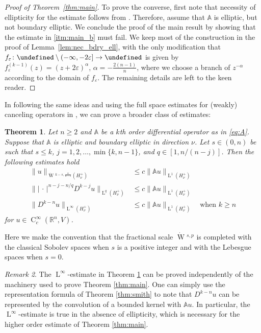 \documentclass[a4paper,10pt]{amsart}
\let\C\undefined
\newcommand{\R}{\mathbb R}
\renewcommand{\leq}{\leqslant}
\newcommand{\lebe}{\operatorname{L}}
\newcommand{\sobo}{\operatorname{W}}
\newcommand{\hold}{\operatorname{C}}
\newcommand{\A}{\mathbb{A}}
\newcommand{\C}{\mathbb{C}}
\numberwithin{equation}{section}
\newtheorem{theorem}{Theorem}[section]
\theoremstyle{remark}
\newtheorem{remark}[theorem]{Remark}
\numberwithin{equation}{section}
\begin{document}
\begin{proof}[Proof of Theorem~\ref{thm:main}]
		To prove the converse, first note that necessity of ellipticity for the estimate follows from \cite[Cor. 5.2]{VS}. Therefore, assume that $\A$ is elliptic, but not boundary elliptic.
		We conclude the proof of the main result by showing that the estimate in \ref{itm:main_b} must fail.
		We keep most of the construction in the proof of Lemma~\ref{lem:nec_bdry_ell}, with the only modification that $f_\varepsilon\colon\C\setminus(-\infty,-2\varepsilon]\rightarrow \C$ is given by $f^{(k-1)}_\varepsilon(z)=(z+2\varepsilon)^{\alpha}$, $\alpha=-\frac{2(n-1)}{n}$, where we choose a branch of $z^{-\alpha}$ according to the domain of $f_\varepsilon$. The remaining details are left to the keen reader.
	\end{proof}
	In following the same ideas and using the full space estimates for (weakly) canceling operators in \cite{VS,BVS,R_tams}, we can prove a broader class of estimates:
	\begin{theorem}\label{thm:estimates}
		Let \(n \ge 2\) and $\A$ be a $k$th order differential operator as in \eqref{eq:A}. Suppose that $\A$ is elliptic and boundary elliptic in direction $\nu$. Let $s\in(0,n)$ be such that $s\leq k$, $j=1,2,\ldots,\min\{k,n-1\}$, and $q\in[1,n/(n-j)]$. Then the following estimates hold
		\begin{align*}
			\|u\|_{{\dot{\sobo}}{^{k-s,\frac{n}{n-s}}}(H^+_\nu)}&\leq c\|\A u\|_{\lebe^1(H^+_\nu)}\\
			\||\,\cdot\,|^{n-j-n/q}D^{k-j}u\|_{\lebe^q(H^+_\nu)}&\leq c\|\A u\|_{\lebe^1(H^+_\nu)}\\
			\|D^{k-n}u\|_{\lebe^\infty(H^+_\nu)}&\leq c\|\A u\|_{\lebe^1(H^+_\nu)}\quad\text{when } k\geq n
		\end{align*}
		for $u\in\hold_c^\infty(\R^n,V)$.
	\end{theorem}
	Here we make the convention that the fractional scale ${\dot{\sobo}}{^{s,p}}$ is completed with the classical Sobolev spaces when $s$ is a positive integer and with the Lebesgue spaces when $s=0$.
	\begin{remark}
		The $\lebe^\infty$-estimate in Theorem \ref{thm:estimates} can be proved independently of the machinery used to prove Theorem \ref{thm:main}. One can simply use the representation formula of Theorem \ref{thm:smith} to note that $D^{k-n}u$ can be represented by the convolution of a bounded kernel with $\A u$. In particular, the $\lebe^\infty$-estimate is true in the absence of ellipticity, which is necessary for the higher order estimate of Theorem \ref{thm:main}.
	\end{remark}
\end{document}
